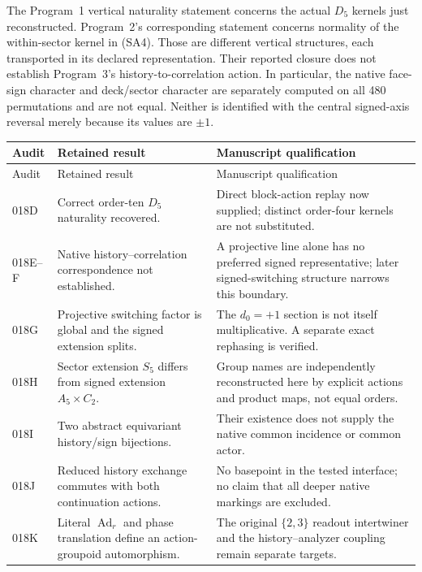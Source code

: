 The Program~1 vertical naturality statement concerns the actual $D_5$ kernels just reconstructed. Program~2's corresponding statement concerns normality of the within-sector kernel in (SA4). Those are different vertical structures, each transported in its declared representation. Their reported closure does not establish Program~3's history-to-correlation action. In particular, the native face-sign character and deck/sector character are separately computed on all 480 permutations and are not equal. Neither is identified with the central signed-axis reversal merely because its values are $\pm1$.

\small
\begin{longtable}{@{}p{}p{}p{}@{}}
\toprule
Audit & Retained result & Manuscript qualification \\
\midrule
\endfirsthead
\toprule Audit & Retained result & Manuscript qualification \\
\midrule
\endhead
018D & Correct order-ten $D_5$ naturality recovered. & Direct block-action replay now supplied; distinct order-four kernels are not substituted. \\
018E--F & Native history--correlation correspondence not established. & A projective line alone has no preferred signed representative; later signed-switching structure narrows this boundary. \\
018G & Projective switching factor is global and the signed extension splits. & The $d_0=+1$ section is not itself multiplicative. A separate exact rephasing is verified. \\
018H & Sector extension $S_5$ differs from signed extension $A_5\times C_2$. & Group names are independently reconstructed here by explicit actions and product maps, not equal orders. \\
018I & Two abstract equivariant history/sign bijections. & Their existence does not supply the native common incidence or common actor. \\
018J & Reduced history exchange commutes with both continuation actions. & No basepoint in the tested interface; no claim that all deeper native markings are excluded. \\
018K & Literal $\operatorname{Ad}_r$ and phase translation define an action-groupoid automorphism. & The original $\{2,3\}$ readout intertwiner and the history--analyzer coupling remain separate targets. \\
\bottomrule
\end{longtable}
\normalsize

